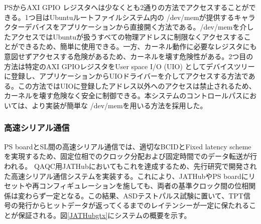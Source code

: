 PSからAXI GPIO レジスタへは少なくとも2通りの方法でアクセスすることができる。1つ目はUbuntuルートファイルシステム内の /dev/memが提供するキャラクターデバイスをアプリケーションから直接開く方法である。/dev/memを介したアクセスではUbuntuが扱うすべての物理アドレスに制限なくアクセスすることができるため、簡単に使用できる。一方、カーネル動作に必要なレジスタにも意図せずアクセスする危険があるため、カーネルを壊す危険性がある。2つ目の方法は特定のAXI GPIOレジスタをUser space I/O (UIO) としてデバイスツリーに登録し、アプリケーションからUIOドライバーを介してアクセスする方法である。この方法ではUIOに登録したアドレス以外へのアクセスは禁止されるため、カーネルを壊す危険なく安全に制御できる。本システムのコントロールパスにおいては、より実装が簡単な /dev/memを用いる方法を採用した。


\subsubsection{高速シリアル通信}
\baselineskip
\label{subsubsec_gtx}
PS boardとSL間の高速シリアル通信では、適切なBCIDとFixed latency schemeを実現するため、固定位相でのクロック分配および固定時間でのデータ転送が行われる。
QAQC用JATHubにおいてもこれを達成するため、先行研究\cite{mt_aoki}で開発された高速シリアル通信システムを実装する。これにより、JATHubやPS boardにリセットや再コンフィギュレーションを施しても、両者の基準クロック間の位相関係は変わらず一定となる。この結果、ASDテストパルス試験に置いて、TPT信号の発行からヒットデータが返ってくるまでのレイテンシーが一定に保たれることが保証される。図\ref{JATHubgtx}にシステムの概要を示す。



